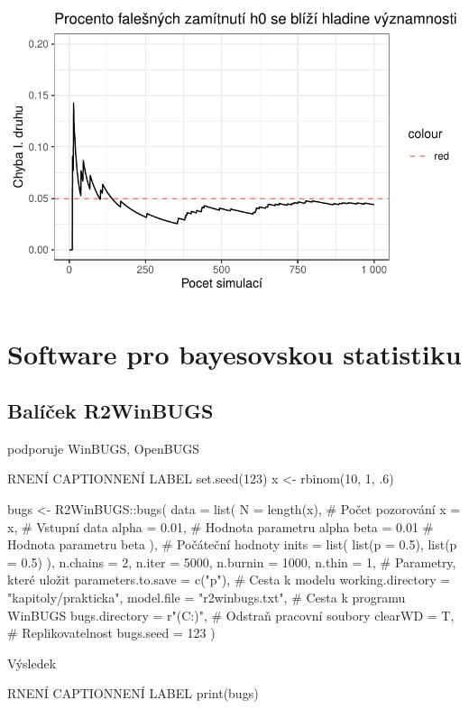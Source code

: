 \documentclass[
  11pt,
  a4paper]{report}
\begin{document}
\includegraphics{index_files/figure-pdf/unnamed-chunk-4-1.pdf}

\section{Software pro bayesovskou
statistiku}\label{software-pro-bayesovskou-statistiku}

\subsection{Balíček R2WinBUGS}\label{baluxedux10dek-r2winbugs}

podporuje WinBUGS, OpenBUGS

\begin{code}{R}{NENÍ CAPTION}{NENÍ LABEL}
set.seed(123)
x <- rbinom(10, 1, .6)

bugs <- R2WinBUGS::bugs(
    data = list(
        N     = length(x), # Počet pozorování
        x     = x,         # Vstupní data
        alpha = 0.01,      # Hodnota parametru alpha
        beta  = 0.01       # Hodnota parametru beta
    ),
    # Počáteční hodnoty
    inits = list(
        list(p = 0.5),
        list(p = 0.5)
    ),
    n.chains = 2, n.iter = 5000, n.burnin = 1000, n.thin = 1,
    # Parametry, které uložit
    parameters.to.save = c("p"),
    # Cesta k modelu
    working.directory = "kapitoly/prakticka",
    model.file = "r2winbugs.txt",
    # Cesta k programu WinBUGS
    bugs.directory = r"(C:\Users\Mike\Downloads{})",
    # Odstraň pracovní soubory
    clearWD = T,
    # Replikovatelnost
    bugs.seed = 123
)
\end{code}

Výsledek

\begin{code}{R}{NENÍ CAPTION}{NENÍ LABEL}
print(bugs)
\end{code}
\end{document}
